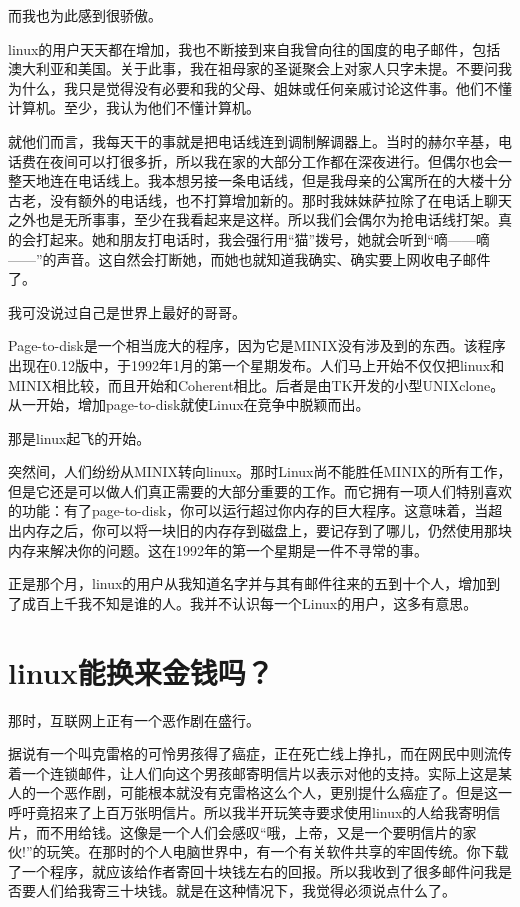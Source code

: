 而我也为此感到很骄傲。

 

linux的用户天天都在增加，我也不断接到来自我曾向往的国度的电子邮件，包括澳大利亚和美国。关于此事，我在祖母家的圣诞聚会上对家人只字未提。不要问我为什么，我只是觉得没有必要和我的父母、姐妹或任何亲戚讨论这件事。他们不懂计算机。至少，我认为他们不懂计算机。

就他们而言，我每天干的事就是把电话线连到调制解调器上。当时的赫尔辛基，电话费在夜间可以打很多折，所以我在家的大部分工作都在深夜进行。但偶尔也会一整天地连在电话线上。我本想另接一条电话线，但是我母亲的公寓所在的大楼十分古老，没有额外的电话线，也不打算增加新的。那时我妹妹萨拉除了在电话上聊天之外也是无所事事，至少在我看起来是这样。所以我们会偶尔为抢电话线打架。真的会打起来。她和朋友打电话时，我会强行用“猫”拨号，她就会听到“嘀——嘀——”的声音。这自然会打断她，而她也就知道我确实、确实要上网收电子邮件了。

我可没说过自己是世界上最好的哥哥。

Page-to-disk是一个相当庞大的程序，因为它是MINIX没有涉及到的东西。该程序出现在0.12版中，于1992年1月的第一个星期发布。人们马上开始不仅仅把linux和MINIX相比较，而且开始和Coherent相比。后者是由TK开发的小型UNIXclone。从一开始，增加page-to-disk就使Linux在竞争中脱颖而出。

那是linux起飞的开始。

突然间，人们纷纷从MINIX转向linux。那时Linux尚不能胜任MINIX的所有工作，但是它还是可以做人们真正需要的大部分重要的工作。而它拥有一项人们特别喜欢的功能：有了page-to-disk，你可以运行超过你内存的巨大程序。这意味着，当超出内存之后，你可以将一块旧的内存存到磁盘上，要记存到了哪儿，仍然使用那块内存来解决你的问题。这在1992年的第一个星期是一件不寻常的事。

正是那个月，linux的用户从我知道名字并与其有邮件往来的五到十个人，增加到了成百上千我不知是谁的人。我并不认识每一个Linux的用户，这多有意思。

 
\section{linux能换来金钱吗？}

那时，互联网上正有一个恶作剧在盛行。

据说有一个叫克雷格的可怜男孩得了癌症，正在死亡线上挣扎，而在网民中则流传着一个连锁邮件，让人们向这个男孩邮寄明信片以表示对他的支持。实际上这是某人的一个恶作剧，可能根本就没有克雷格这么个人，更别提什么癌症了。但是这一呼吁竟招来了上百万张明信片。所以我半开玩笑寺要求使用linux的人给我寄明信片，而不用给钱。这像是一个人们会感叹“哦，上帝，又是一个要明信片的家伙!”的玩笑。在那时的个人电脑世界中，有一个有关软件共享的牢固传统。你下载了一个程序，就应该给作者寄回十块钱左右的回报。所以我收到了很多邮件问我是否要人们给我寄三十块钱。就是在这种情况下，我觉得必须说点什么了。

